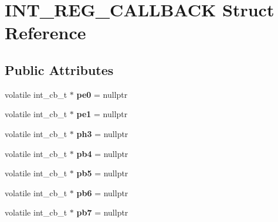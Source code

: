 \hypertarget{structINT__REG__CALLBACK}{}\section{I\+N\+T\+\_\+\+R\+E\+G\+\_\+\+C\+A\+L\+L\+B\+A\+CK Struct Reference}
\label{structINT__REG__CALLBACK}
\subsection*{Public Attributes}
\begin{DoxyCompactItemize}
\item 
\mbox{\label{structINT__REG__CALLBACK_aa932181035723b3de2ec5f82db946557}} 
volatile int\+\_\+cb\+\_\+t $\ast$ {\bfseries pe0} = nullptr
\item 
\mbox{\label{structINT__REG__CALLBACK_acbfc6b664a8852266985391d5dcefb7a}} 
volatile int\+\_\+cb\+\_\+t $\ast$ {\bfseries pe1} = nullptr
\item 
\mbox{\label{structINT__REG__CALLBACK_ae29f0525c9174e162bea4ef23a5b9d71}} 
volatile int\+\_\+cb\+\_\+t $\ast$ {\bfseries ph3} = nullptr
\item 
\mbox{\label{structINT__REG__CALLBACK_a43da983ddbba9d6a0c8cf96f1e3fc3f4}} 
volatile int\+\_\+cb\+\_\+t $\ast$ {\bfseries pb4} = nullptr
\item 
\mbox{\label{structINT__REG__CALLBACK_a219d24c34c9ced938e995fd58f435e43}} 
volatile int\+\_\+cb\+\_\+t $\ast$ {\bfseries pb5} = nullptr
\item 
\mbox{\label{structINT__REG__CALLBACK_ad819d37ce1f7d80a57a170f0c7b918fe}} 
volatile int\+\_\+cb\+\_\+t $\ast$ {\bfseries pb6} = nullptr
\item 
\mbox{\label{structINT__REG__CALLBACK_a89c3284d40d6a95ba349bd641c188a73}} 
volatile int\+\_\+cb\+\_\+t $\ast$ {\bfseries pb7} = nullptr
\item 
\mbox{\label{structINT__REG__CALLBACK_ad62a5473687b44b0d7a902bce7a7dacd}} 

\end{DoxyCompactItemize}
